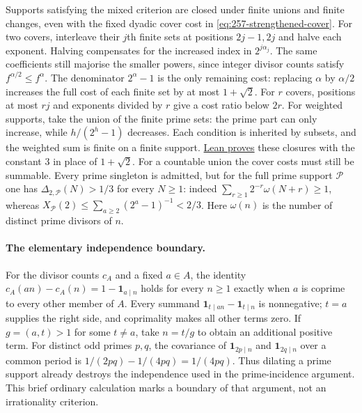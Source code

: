 \documentclass[11pt]{article}
\theoremstyle{plain}
\theoremstyle{definition}
\theoremstyle{remark}
\begin{document}
Supports satisfying the mixed criterion are closed under finite unions
and finite changes, even with the fixed dyadic cover cost in
\eqref{eq:257-strengthened-cover}. For two covers, interleave their $j$th
finite sets at positions $2j-1,2j$ and halve each exponent. Halving
compensates for the increased index in $2^{j\alpha_j}$.
The same coefficients still majorise the smaller powers, since integer
divisor counts satisfy $f^{\alpha/2}\le f^\alpha$.
The denominator $2^\alpha-1$ is the only remaining cost: replacing
$\alpha$ by $\alpha/2$ increases the full cost of each finite set by at
most $1+\sqrt2$.  For $r$ covers, positions at most $rj$ and
exponents divided by $r$ give a cost ratio below $2r$.  For weighted
supports, take the union of the finite prime sets: the prime part can
only increase, while $h/(2^h-1)$ decreases. Each condition is inherited
by subsets, and the weighted sum is finite on a finite support.
\href{https://github.com/wcook04/plectis-erdos/blob/3973d3b10bce72017b8f60093f0d6c3f4f592d80/lean/ErdosProblems/Erdos257/PaperCompleteR8/StrengthenedCoverFiniteUnion.lean#L167}{Lean proves}
these closures with the constant $3$ in place of $1+\sqrt2$.
For a countable union the cover costs must still be summable.  Every prime singleton is admitted,
but for the full prime support $\mathcal P$ one has
$\Delta_{2,\mathcal P}(N)>1/3$ for every $N\ge1$: indeed
$\sum_{r\ge1}2^{-r}\omega(N+r)\ge1$, whereas
$X_{\mathcal P}(2)\le\sum_{a\ge2}(2^a-1)^{-1}<2/3$.
Here $\omega(n)$ is the number of distinct prime divisors of $n$.

\paragraph{The elementary independence boundary.}
For the divisor counts $c_A$ and a fixed $a\in A$,
the identity $c_A(an)-c_A(n)=1-\mathbf1_{a\mid n}$ holds for every
$n\ge1$ exactly when $a$ is coprime to every other member of $A$.
Every summand $\mathbf1_{t\mid an}-\mathbf1_{t\mid n}$ is nonnegative;
$t=a$ supplies the right side, and coprimality makes all other terms zero.
If $g=(a,t)>1$ for some $t\ne a$, take $n=t/g$ to obtain an additional
positive term.  For distinct odd primes $p,q$, the covariance of
$\mathbf1_{2p\mid n}$ and $\mathbf1_{2q\mid n}$ over a common period is
$1/(2pq)-1/(4pq)=1/(4pq)$.  Thus dilating a prime support already destroys
the independence used in the prime-incidence argument.  This brief ordinary
calculation marks a boundary of that argument, not an irrationality criterion.
\end{document}

